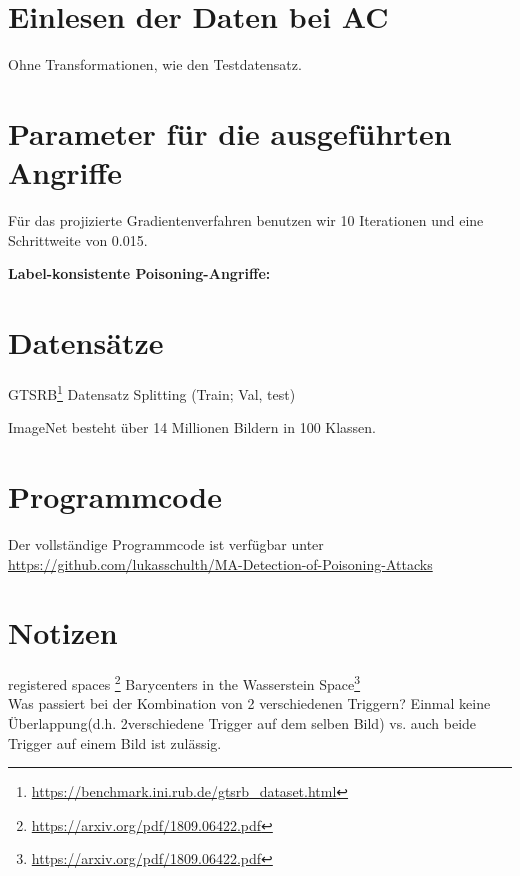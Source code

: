 \documentclass[11pt,a4paper]{article}
\numberwithin{equation}{section}
\begin{document}
	\section{Einlesen der Daten bei AC}
	Ohne Transformationen, wie den Testdatensatz.
	
	
	\section{Parameter für die ausgeführten Angriffe}\label{param_attacks}
	Für das projizierte Gradientenverfahren benutzen wir 10 Iterationen und eine Schrittweite von 0.015.
	
	\textbf{Label-konsistente Poisoning-Angriffe:}
	\section{Datensätze}
	GTSRB\footnote{\url{https://benchmark.ini.rub.de/gtsrb_dataset.html}}
	Datensatz Splitting (Train; Val, test)
	
	ImageNet besteht über 14 Millionen Bildern in 100 Klassen.
	\section{Programmcode}
	Der vollständige Programmcode ist verfügbar unter \url{https://github.com/lukasschulth/MA-Detection-of-Poisoning-Attacks}
	
	
	\section{Notizen}
	registered spaces \footnote{\url{https://arxiv.org/pdf/1809.06422.pdf}}
	Barycenters in the Wasserstein Space\footnote{\url{https://arxiv.org/pdf/1809.06422.pdf}}\\
	Was passiert bei der Kombination von 2 verschiedenen Triggern? Einmal keine Überlappung(d.h. 2verschiedene Trigger auf dem selben Bild) vs. auch beide Trigger auf einem Bild ist zulässig.
	\newpage
	
	\printglossaries
	
	\newpage
	
	
	
	
	
	
	
\end{document}
